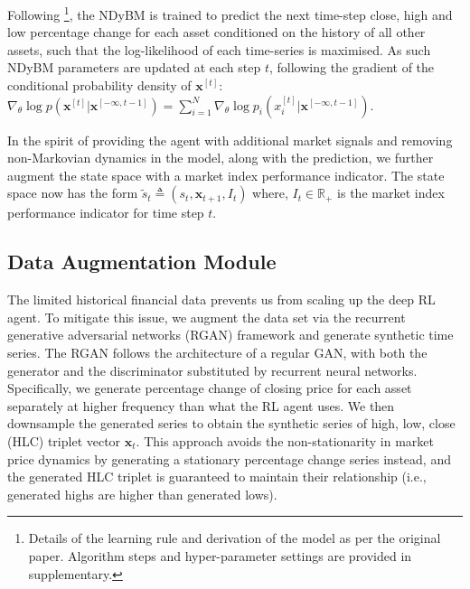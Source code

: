 \documentclass{article}
\begin{document}
Following \cite{dasgupta2017nonlinear}\footnote{Details of the learning rule and derivation of the model as per the original paper. Algorithm steps and hyper-parameter settings are provided in supplementary.}, the NDyBM is trained to predict the next time-step close, high and low percentage change for each asset conditioned on the history of all other assets, such that the log-likelihood of each time-series is maximised. As such NDyBM parameters are updated at each step $t$, following the gradient of the conditional probability density of $\mathbf{x}^{[t]}$: $\nabla_\theta \log p(\mathbf{x}^{[t]}|\mathbf{x}^{[-\infty,t-1]}) = \sum_{i=1}^N \nabla_\theta \log p_i(x_i^{[t]}|\mathbf{x}^{[-\infty,t-1]})$.

In the spirit of providing the agent with additional market signals and removing non-Markovian dynamics in the model, along with the prediction, we further augment the state space with a market index performance indicator. The state space now has the form $\tilde{s}_{t}\triangleq(s_t,\mathbf{x}_{t+1},I_t)$ where,  $I_t\in\mathbb{R}_{+}$ is the market index performance indicator for time step $t$.

\subsection{Data Augmentation Module}\label{sec3.2}
The limited historical financial data prevents us from scaling up the deep RL agent. To mitigate this issue, we augment the data set via the recurrent generative adversarial networks (RGAN) framework \cite{esteban2017real} and generate synthetic time series. The RGAN follows the architecture of a regular GAN, with both the generator and the discriminator substituted by recurrent neural networks. Specifically, we generate percentage change of closing price for each asset separately at higher frequency than what the RL agent uses. We then downsample the generated series to obtain the synthetic series of high, low, close (HLC) triplet vector $\mathbf{x}_t$. This approach avoids the non-stationarity in market price dynamics by generating a stationary percentage change series instead, and the generated HLC triplet is guaranteed to maintain their relationship (i.e., generated highs are higher than generated lows).
\end{document}
